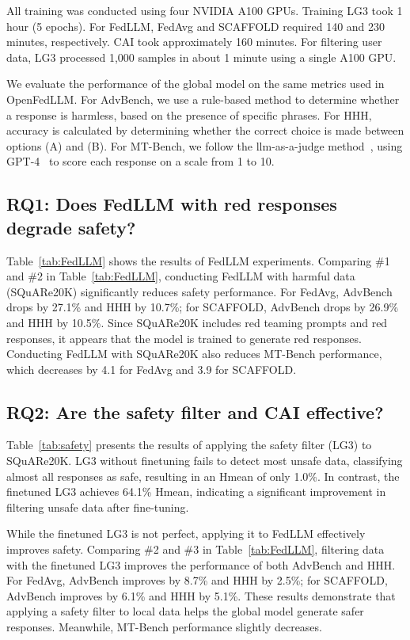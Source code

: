 All training was conducted using four NVIDIA A100 GPUs. Training LG3 took 1 hour (5 epochs).
For FedLLM, FedAvg and SCAFFOLD required 140 and 230 minutes, respectively.
CAI took approximately 160 minutes.
For filtering user data, LG3 processed 1,000 samples in about 1 minute using a single A100 GPU.


We evaluate the performance of the global model on the same metrics used in OpenFedLLM.  
For AdvBench, we use a rule-based method to determine whether a response is harmless, based on the presence of specific phrases.  
For HHH, accuracy is calculated by determining whether the correct choice is made between options (A) and (B).  
For MT-Bench, we follow the llm-as-a-judge method~\cite{mtbench}, using GPT-4~\cite{openai2023gpt4} to score each response on a scale from 1 to 10.  


\subsection{RQ1: Does FedLLM with red responses degrade safety?}
Table~\ref{tab:FedLLM} shows the results of FedLLM experiments.  
Comparing \#1 and \#2 in Table~\ref{tab:FedLLM}, conducting FedLLM with harmful data (SQuARe20K) significantly reduces safety performance.  
For FedAvg, AdvBench drops by 27.1\% and HHH by 10.7\%; for SCAFFOLD, AdvBench drops by 26.9\% and HHH by 10.5\%.  
Since SQuARe20K includes red teaming prompts and red responses, it appears that the model is trained to generate red responses.  
Conducting FedLLM with SQuARe20K also reduces MT-Bench performance, which decreases by 4.1 for FedAvg and 3.9 for SCAFFOLD.  


\subsection{RQ2: Are the safety filter and CAI effective?}
Table~\ref{tab:safety} presents the results of applying the safety filter (LG3) to SQuARe20K.  
LG3 without finetuning fails to detect most unsafe data, classifying almost all responses as safe, resulting in an Hmean of only 1.0\%.
In contrast, the finetuned LG3 achieves 64.1\% Hmean, indicating a significant improvement in filtering unsafe data after fine-tuning. 

While the finetuned LG3 is not perfect, applying it to FedLLM effectively improves safety.
Comparing \#2 and \#3 in Table~\ref{tab:FedLLM}, filtering data with the finetuned LG3 improves the performance of both AdvBench and HHH.  
For FedAvg, AdvBench improves by 8.7\% and HHH by 2.5\%; for SCAFFOLD, AdvBench improves by 6.1\% and HHH by 5.1\%. 
These results demonstrate that applying a safety filter to local data helps the global model generate safer responses.
Meanwhile, MT-Bench performance slightly decreases.  


